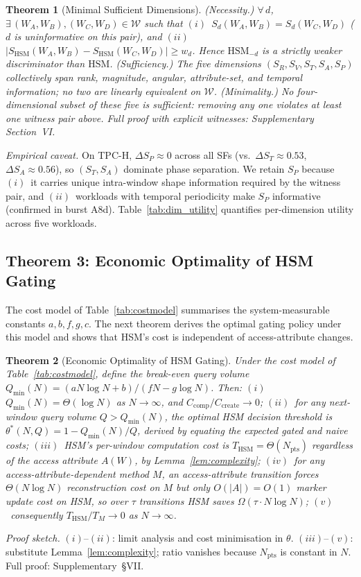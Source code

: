 \documentclass[10pt,twocolumn,a4paper]{article}
\newtheorem{theorem}{Theorem}
\newcommand{\SHSM}{S_{\mathrm{HSM}}}
\newcommand{\SR}{S_{R}}
\newcommand{\SV}{S_{V}}
\newcommand{\ST}{S_{T}}
\newcommand{\SA}{S_{A}}
\newcommand{\SPER}{S_{P}}
\newcommand{\Npts}{N_{\mathrm{pts}}}
\newcommand{\thetastar}{\theta^{*}}
\begin{document}
\begin{theorem}[Minimal Sufficient Dimensions]\label{thm:minimal}
\emph{(Necessity.)} $\forall\,d$, $\exists\,(W_A,W_B),(W_C,W_D)\!\in\!\mathcal{W}$
such that $(i)$~$S_{d}(W_A,W_B)\!=\!S_{d}(W_C,W_D)$ ($d$ is
uninformative on this pair), and
$(ii)$~$|\SHSM(W_A,W_B)-\SHSM(W_C,W_D)|\geq w_{d}$. Hence
$\mathrm{HSM}_{-d}$ is a strictly weaker discriminator than $\mathrm{HSM}$.
\emph{(Sufficiency.)} The five dimensions $(\SR,\SV,\ST,\SA,\SPER)$
collectively span rank, magnitude, angular, attribute-set, and temporal
information; no two are linearly equivalent on $\mathcal{W}$.
\emph{(Minimality.)} No four-dimensional subset of these five is
sufficient: removing any one violates at least one witness pair above.
Full proof with explicit witnesses: Supplementary Section~VI.
\end{theorem}

\noindent\textit{Empirical caveat.}
On TPC-H, $\Delta\SPER\!\approx\!0$ across all SFs (vs.\ $\Delta\ST\!\approx\!0.53$, $\Delta\SA\!\approx\!0.56$), so $(\ST,\SA)$ dominate phase separation.
We retain $\SPER$ because $(i)$~it carries unique intra-window shape information required by the witness pair,
and $(ii)$~workloads with temporal periodicity make $\SPER$ informative (confirmed in burst A8d).
Table~\ref{tab:dim_utility} quantifies per-dimension utility across five workloads.

\subsection{Theorem 3: Economic Optimality of HSM Gating}

The cost model of Table~\ref{tab:costmodel} summarises the
system-measurable constants $a,b,f,g,c$. The next theorem derives
the optimal gating policy under this model and shows that HSM's cost
is independent of access-attribute changes.

\begin{theorem}[Economic Optimality of HSM Gating]\label{thm:econ}
Under the cost model of Table~\ref{tab:costmodel}, define the
break-even query volume
$Q_{\min}(N)\!=\!(aN\log N+b)/(fN-g\log N)$. Then:
$(i)$~$Q_{\min}(N)\!=\!\Theta(\log N)$ as $N\!\to\!\infty$, and
$C_{\mathrm{comp}}/C_{\mathrm{create}}\!\to\!0$;
$(ii)$~for any next-window query volume $Q\!>\!Q_{\min}(N)$, the
optimal HSM decision threshold is
$\thetastar(N,Q)\!=\!1-Q_{\min}(N)/Q$, derived by equating the
expected gated and naive costs;
$(iii)$~HSM's per-window computation cost is
$T_{\mathrm{HSM}}\!=\!\Theta(\Npts)$ \emph{regardless} of the access
attribute $A(W)$, by Lemma~\ref{lem:complexity};
$(iv)$~for any access-attribute-dependent method $M$, an
access-attribute transition forces $\Theta(N\log N)$ reconstruction
cost on $M$ but only $O(|A|)\!=\!O(1)$ marker update cost on HSM, so
over $\tau$ transitions HSM saves $\Omega(\tau\cdot N\log N)$;
$(v)$~consequently $T_{\mathrm{HSM}}/T_{M}\!\to\!0$ as $N\!\to\!\infty$.
\end{theorem}
\noindent\textit{Proof sketch.}
$(i)$--$(ii)$: limit analysis and cost minimisation in $\theta$.
$(iii)$--$(v)$: substitute Lemma~\ref{lem:complexity}; ratio vanishes because $\Npts$ is constant in $N$.
Full proof: Supplementary~\S VII.
\end{document}
